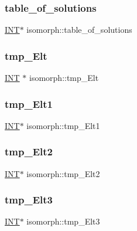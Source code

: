 \subsubsection{\texorpdfstring{table\+\_\+of\+\_\+solutions}{table\_of\_solutions}}
{\footnotesize\ttfamily \mbox{\hyperlink{galois_8h_a09fddde158a3a20bd2dcadb609de11dc}{I\+NT}}$\ast$ isomorph\+::table\+\_\+of\+\_\+solutions}

\mbox{\label{classisomorph_ac5900a10a991a49726a0bcd80a0c785d}} 
\subsubsection{\texorpdfstring{tmp\+\_\+\+Elt}{tmp\_Elt}}
{\footnotesize\ttfamily \mbox{\hyperlink{galois_8h_a09fddde158a3a20bd2dcadb609de11dc}{I\+NT}} $\ast$ isomorph\+::tmp\+\_\+\+Elt}

\mbox{\label{classisomorph_a8abd75382b94af72cdaf3c9da0f4d5c5}} 
\subsubsection{\texorpdfstring{tmp\+\_\+\+Elt1}{tmp\_Elt1}}
{\footnotesize\ttfamily \mbox{\hyperlink{galois_8h_a09fddde158a3a20bd2dcadb609de11dc}{I\+NT}}$\ast$ isomorph\+::tmp\+\_\+\+Elt1}

\mbox{\label{classisomorph_a3d8b7bde4d42607658aba72a1af40a99}} 
\subsubsection{\texorpdfstring{tmp\+\_\+\+Elt2}{tmp\_Elt2}}
{\footnotesize\ttfamily \mbox{\hyperlink{galois_8h_a09fddde158a3a20bd2dcadb609de11dc}{I\+NT}}$\ast$ isomorph\+::tmp\+\_\+\+Elt2}

\mbox{\label{classisomorph_aa4c03ed38989f18b7f076bd2f3c81f35}} 
\subsubsection{\texorpdfstring{tmp\+\_\+\+Elt3}{tmp\_Elt3}}
{\footnotesize\ttfamily \mbox{\hyperlink{galois_8h_a09fddde158a3a20bd2dcadb609de11dc}{I\+NT}}$\ast$ isomorph\+::tmp\+\_\+\+Elt3}

